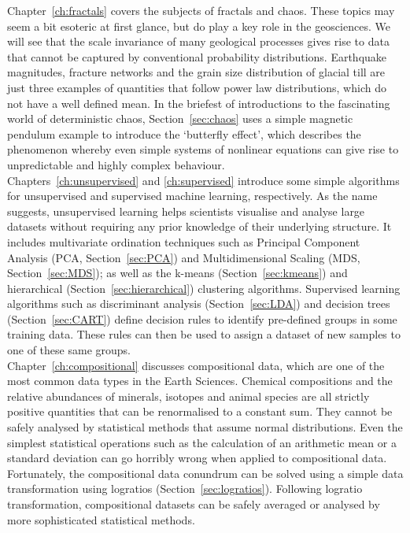 Chapter~\ref{ch:fractals} covers the subjects of fractals and
chaos. These topics may seem a bit esoteric at first glance, but do
play a key role in the geosciences. We will see that the scale
invariance of many geological processes gives rise to data that cannot
be captured by conventional probability distributions. Earthquake
magnitudes, fracture networks and the grain size distribution of
glacial till are just three examples of quantities that follow power
law distributions, which do not have a well defined mean. In the
briefest of introductions to the fascinating world of deterministic
chaos, Section~\ref{sec:chaos} uses a simple magnetic pendulum example
to introduce the `butterfly effect', which describes the phenomenon
whereby even simple systems of nonlinear equations can give rise to
unpredictable and highly complex behaviour.\\

Chapters~\ref{ch:unsupervised} and \ref{ch:supervised} introduce some
simple algorithms for unsupervised and supervised machine learning,
respectively. As the name suggests, unsupervised learning helps
scientists visualise and analyse large datasets without requiring any
prior knowledge of their underlying structure. It includes
multivariate ordination techniques such as Principal Component
Analysis (PCA, Section~\ref{sec:PCA}) and Multidimensional Scaling
(MDS, Section~\ref{sec:MDS}); as well as the k-means
(Section~\ref{sec:kmeans}) and hierarchical
(Section~\ref{sec:hierarchical}) clustering algorithms. Supervised
learning algorithms such as discriminant analysis
(Section~\ref{sec:LDA}) and decision trees (Section~\ref{sec:CART})
define decision rules to identify pre-defined groups in some training
data. These rules can then be used to assign a dataset of new samples
to one of these same groups.\\

Chapter~\ref{ch:compositional} discusses compositional data, which are
one of the most common data types in the Earth Sciences. Chemical
compositions and the relative abundances of minerals, isotopes and
animal species are all strictly positive quantities that can be
renormalised to a constant sum. They cannot be safely analysed by
statistical methods that assume normal distributions. Even the
simplest statistical operations such as the calculation of an
arithmetic mean or a standard deviation can go horribly wrong when
applied to compositional data. Fortunately, the compositional data
conundrum can be solved using a simple data transformation using
logratios (Section~\ref{sec:logratios}). Following logratio
transformation, compositional datasets can be safely averaged or
analysed by more sophisticated statistical methods.\\

